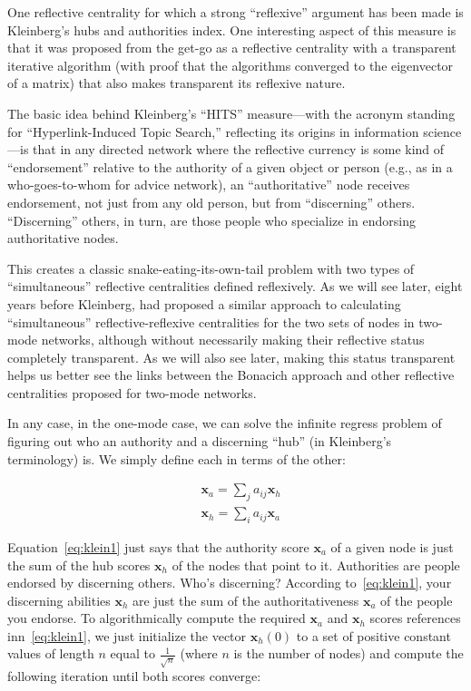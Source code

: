 \documentclass[a4paper,fleqn]{cas-sc}
\begin{document}
One reflective centrality for which a strong ``reflexive'' argument has been made is Kleinberg's \citeyearpar{kleinberg99} hubs and authorities index. One interesting aspect of this measure is that it was proposed from the get-go as a reflective centrality with a transparent iterative algorithm (with proof that the algorithms converged to the eigenvector of a matrix) that also makes transparent its reflexive nature. 

The basic idea behind Kleinberg's ``HITS'' measure---with the acronym standing for ``Hyperlink-Induced Topic Search,'' reflecting its origins in information science---is that in any directed network where the reflective currency is some kind of ``endorsement'' relative to the authority of a given object or person (e.g., as in a who-goes-to-whom for advice network), an ``authoritative'' node receives endorsement, not just from any old person, but from ``discerning'' others.  ``Discerning'' others, in turn, are those people who specialize in endorsing authoritative nodes. 

This creates a classic snake-eating-its-own-tail problem with two types of ``simultaneous'' reflective centralities defined reflexively. As we will see later, eight years before Kleinberg, \citet{bonacich91} had proposed a similar approach to calculating ``simultaneous'' reflective-reflexive centralities for the two sets of nodes in two-mode networks, although without necessarily making their reflective status completely transparent. As we will also see later, making this status transparent helps us better see the links between the Bonacich approach and other reflective centralities proposed for two-mode networks. 

In any case, in the one-mode case, we can solve the infinite regress problem of figuring out who an authority and a discerning ``hub'' (in Kleinberg's terminology) is. We simply define each in terms of the other:

\begin{equation}
    \begin{split}
    &\mathbf{x}_a = \sum_j a_{ij} \mathbf{x}_h \\
    &\mathbf{x}_h = \sum_i  a_{ij} \mathbf{x}_a 
    \end{split}
    \label{eq:klein1}
\end{equation}

Equation~\ref{eq:klein1} just says that the authority score $\mathbf{x}_a$ of a given node is just the sum of the hub scores $\mathbf{x}_h$ of the nodes that point to it. Authorities are people endorsed by discerning others. Who's discerning? According to~\ref{eq:klein1}, your discerning abilities $\mathbf{x}_h$ are just the sum of the authoritativeness $\mathbf{x}_a$ of the people you endorse. To algorithmically compute the required $\mathbf{x}_a$ and $\mathbf{x}_h$ scores references inn~\ref{eq:klein1}, we just initialize the vector $\mathbf{x}_h(0)$ to a set of positive constant values of length $n$ equal to $\frac{1}{\sqrt{{n}}}$ (where $n$ is the number of nodes) and compute the following iteration until both scores converge:
\end{document}
